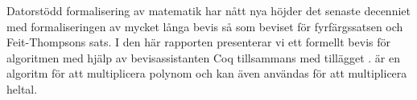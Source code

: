 Datorstödd formalisering av matematik har nått nya höjder det
senaste decenniet med formaliseringen av mycket långa bevis så
som beviset för fyrfärgssatsen och Feit-Thompsons sats. I den
här rapporten presenterar vi ett formellt bevis för algoritmen
\toom med hjälp av bevisassistanten Coq tillsammans med
tillägget \ssr. \toom är en algoritm för att multiplicera
polynom och kan även användas för att multiplicera heltal.

